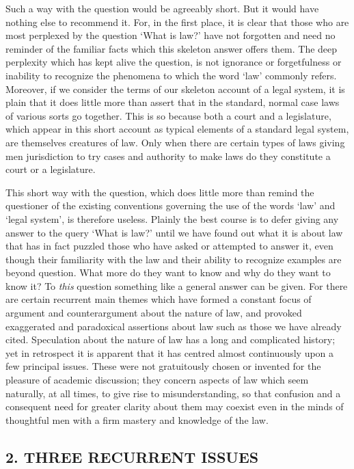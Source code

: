 Such a way with the question would be agreeably short. But it would have
nothing else to recommend it. For, in the first place, it is clear that
those who are most perplexed by the question `What is law?' have not
forgotten and need no reminder of the familiar facts which this skeleton
answer offers them. The deep perplexity which has kept alive the
question, is not ignorance or forgetfulness or inability to recognize
the phenomena to which the word `law' commonly refers. Moreover, if we
consider the terms of our skeleton account of a legal system, it is
plain that it does little more than assert that in the standard, normal
case laws of various sorts go together. This is so because both a court
and a legislature, which appear in this short account as typical
elements of a standard legal system, are themselves creatures of law.
Only when there are certain types of laws giving men jurisdiction to try
cases and authority to make laws do they constitute a court or a
legislature.

This short way with the question, which does little more than remind the
questioner of the existing conventions governing the use of the words
`law' and `legal system', is therefore useless. Plainly the best course
is to defer giving any answer to the query `What is law?' until we have
found out what it is about law that has in fact puzzled those who have
asked or attempted to answer it, even though their familiarity with the
law and their ability to recognize examples are beyond question. What
more do they want to know and why do they want to know it? To
\emph{this} question something like a general answer can be given. For
there are certain recurrent main themes which have formed a constant
focus of argument and counterargument about the nature of law, and
provoked exaggerated and paradoxical assertions about law such as those
we have already cited. Speculation about the nature of law has a long
and complicated history; yet in retrospect it is apparent that it has
centred almost continuously upon a few principal issues. These were not
gratuitously chosen or invented for the pleasure of academic discussion;
they concern aspects of law which seem naturally, at all times, to give
rise to misunderstanding, so that confusion and a consequent need for
greater clarity about them may coexist even in the minds of thoughtful
men with a firm mastery and knowledge of the law.

\subsection{\texorpdfstring{\textbf{2. THREE RECURRENT
ISSUES}}{2. THREE RECURRENT ISSUES}}\label{three-recurrent-issues}

